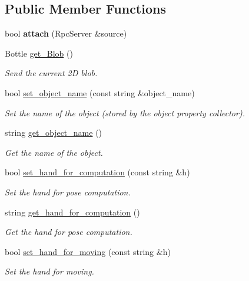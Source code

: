 \subsection*{Public Member Functions}
\begin{DoxyCompactItemize}
\item 
bool {\bfseries attach} (Rpc\-Server \&source)\label{classExperimentOne_a99a9e579f4a79b7a41c445c6a14a45f3}

\item 
Bottle \hyperlink{classExperimentOne_ad36ac49e1121169c5a38e50fa3684023}{get\-\_\-\-Blob} ()
\begin{DoxyCompactList}\small\item\em Send the current 2\-D blob. \end{DoxyCompactList}\item 
bool \hyperlink{classExperimentOne_a9f29aa4b81d957c693e4555cb4c06ccb}{set\-\_\-object\-\_\-name} (const string \&object\-\_\-name)
\begin{DoxyCompactList}\small\item\em Set the name of the object (stored by the object property collector). \end{DoxyCompactList}\item 
string \hyperlink{classExperimentOne_ac087378ef3308b52cef17a2fc9d80dfe}{get\-\_\-object\-\_\-name} ()
\begin{DoxyCompactList}\small\item\em Get the name of the object. \end{DoxyCompactList}\item 
bool \hyperlink{classExperimentOne_a9f4bc21cb93ecd4d4bdebb29ef2684cf}{set\-\_\-hand\-\_\-for\-\_\-computation} (const string \&h)
\begin{DoxyCompactList}\small\item\em Set the hand for pose computation. \end{DoxyCompactList}\item 
string \hyperlink{classExperimentOne_aef03af801993c3d869f0eedde21388dd}{get\-\_\-hand\-\_\-for\-\_\-computation} ()
\begin{DoxyCompactList}\small\item\em Get the hand for pose computation. \end{DoxyCompactList}\item 
bool \hyperlink{classExperimentOne_af9b4928dcc41cdd499f1e81bd7004ba7}{set\-\_\-hand\-\_\-for\-\_\-moving} (const string \&h)
\begin{DoxyCompactList}\small\item\em Set the hand for moving. \end{DoxyCompactList}\item 

\end{DoxyCompactItemize}
